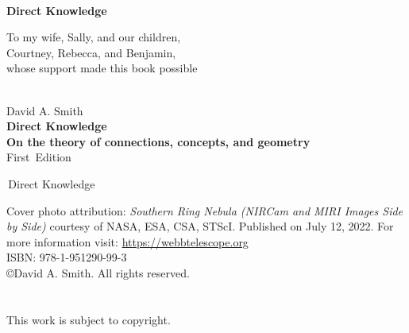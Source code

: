 \def\authname{David A. Smith}
\def\website{https://directknowledge.com}
\def\cred{B.S. Mathematics, M.S. Mathematics}
\def\firstTitle{Direct Knowledge}
\def\secondTitle{On the theory of connections, concepts, and geometry}
\def\publisher{David A. Smith}
\def\isbn{978-1-951290-99-3}
\def\edition{First}
\def\dedication{To my wife, Sally, and our children, \\[10pt] Courtney, Rebecca, and Benjamin, \\[10pt] whose support made this book possible}
\def\cover{Cover photo attribution: \textit{Southern Ring Nebula (NIRCam and MIRI Images Side by Side)} courtesy of NASA, ESA, CSA, STScI. Published on July 12, 2022. For more information visit: \url{https://webbtelescope.org}}


\begin{titlepage}
\pagestyle{empty}\text{ }\\[1in]\begin{center} \Huge \textbf{\sc \firstTitle} \end{center}
\newpage \text{ }\vspace{1in}\begin{center}\begin{minipage}{.85\textwidth}\dedication \vfill\vfill\vfill\text{ }\end{minipage}\end{center}
\clearpage \text{ }\\[30pt]
\noindent\Large \authname \\[50pt]
\noindent\Huge \textbf{\firstTitle} \\[20pt]
\noindent\Large\textbf{\secondTitle} 
\\[25pt]\noindent\large\edition \ Edition
\vfill\begin{flushright}
\huge{\,Direct Knowledge}
\end{flushright}
\newpage\footnotesize\noindent\cover \vfill \text{ } \\[7pt]
ISBN: \isbn \\[10pt]
\copyright \authname. 
All rights reserved. \\ \\ \\ 
This work is subject to copyright. \\ \\ 

\end{titlepage}
